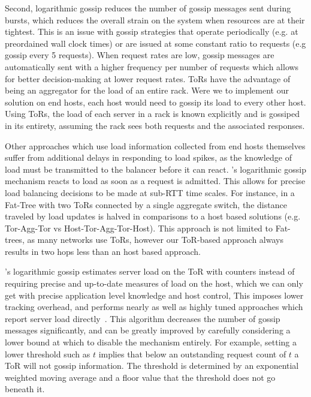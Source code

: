 Second, logarithmic gossip reduces the number of gossip messages sent during 
bursts, which reduces the overall strain on the system when resources
are at their tightest. 
%
This is an issue with gossip strategies that operate periodically (e.g. at preordained wall clock times) or are issued at some constant ratio
to requests (e.g gossip every 5 requests). 
%
When request rates are low, gossip messages are automatically sent with a higher frequency per number of requests which allows for better decision-making at lower
request rates.
ToRs have the advantage of being an aggregator for the load of an
entire rack. 
%
Were we to implement our solution on end hosts, each host
would need to gossip its load to every other host. 
%
Using ToRs, the load of each server in a rack is known explicitly and is gossiped in its entirety, assuming the rack sees both requests and the associated
responses.

Other approaches which use load information collected from end hosts
themselves suffer from additional delays in responding to load spikes,
as the knowledge of load must be transmitted to the balancer before it
can react. \daronpon's logarithmic gossip mechanism reacts to load as soon as a request is admitted. 
%
This allows for precise load balancing decisions to be made at sub-RTT time scales. 
For instance, in a Fat-Tree with two ToRs connected by a single
aggregate switch, the distance traveled by load updates is halved in
comparisons to a host based solutions (e.g. Tor-Agg-Tor vs
Host-Tor-Agg-Tor-Host). This approach is not limited to Fat-trees,
as many networks use ToRs, however our ToR-based approach always results
in two hops less than an host based approach.

\daronpon's logarithmic gossip estimates server load on the ToR with counters instead of  requiring precise and up-to-date measures of load on the host, which we can
only get with precise application level knowledge and host control, 
%
This imposes lower tracking overhead, and performs nearly as well as highly tuned approaches which report server load directly~\cite[Figure. 15 (proactive)]{racksched}.
This algorithm decreases the number of gossip messages
significantly, and can be greatly improved by carefully considering a
lower bound at which to disable the mechanism entirely.
For example, setting a lower threshold such as $t$ implies that below an outstanding request count of $t$ a ToR will not gossip information.
%
The threshold is determined by an exponential weighted moving average and a floor value that the threshold does not go beneath it.

